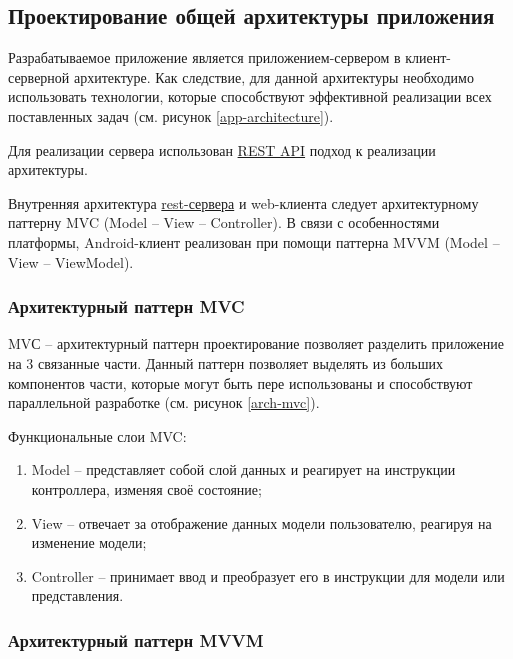 \subsection{Проектирование общей архитектуры приложения}\label{subsec:2-design-architecure}\indent

Разрабатываемое приложение является приложением-сервером в клиент-серверной архитектуре.
Как следствие, для данной архитектуры необходимо использовать технологии, которые способствуют эффективной реализации всех поставленных задач (см. рисунок \ref{app-architecture}).


Для реализации сервера использован \hyperlink{gloss:rest}{REST API} подход к реализации архитектуры.

Внутренняя архитектура \hyperlink{gloss:rest}{rest-сервера} и web-клиента следует архитектурному паттерну MVC (Model – View – Controller).
В связи с особенностями платформы, Android-клиент реализован при помощи паттерна MVVM (Model – View – ViewModel).

\subsubsection{Архитектурный паттерн MVC}\indent

MVС – архитектурный паттерн проектирование позволяет разделить приложение на 3 связанные части.
Данный паттерн позволяет выделять из больших компонентов части, которые могут быть пере использованы и способствуют параллельной разработке (см. рисунок \ref{arch-mvc}).


Функциональные слои MVC:
\begin{enumerate}
    \item Model – представляет собой слой данных и реагирует на инструкции контроллера, изменяя своё состояние;
    \item View – отвечает за отображение данных модели пользователю, реагируя на изменение модели;
    \item Controller – принимает ввод и преобразует его в инструкции для модели или представления.
\end{enumerate}

\subsubsection{Архитектурный паттерн MVVM}\indent

